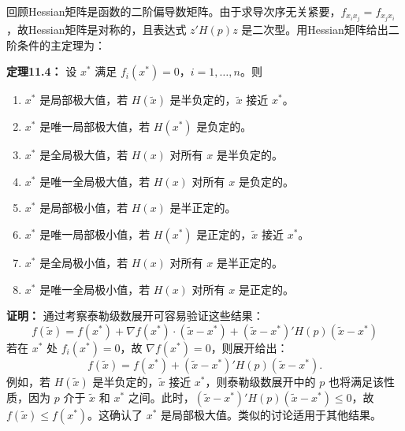 \begin{translation}
回顾Hessian矩阵是函数的二阶偏导数矩阵。由于求导次序无关紧要，$f_{x_i x_j} = f_{x_j x_i}$，故Hessian矩阵是对称的，且表达式 $z'H(p)z$ 是二次型。用Hessian矩阵给出二阶条件的主定理为：

\textbf{定理11.4：} 设 $x^*$ 满足 $f_i(x^*) = 0$，$i = 1,\ldots,n$。则
\begin{enumerate}
\item $x^*$ 是局部极大值，若 $H(\tilde{x})$ 是半负定的，$\tilde{x}$ 接近 $x^*$。
\item $x^*$ 是唯一局部极大值，若 $H(x^*)$ 是负定的。
\item $x^*$ 是全局极大值，若 $H(x)$ 对所有 $x$ 是半负定的。
\item $x^*$ 是唯一全局极大值，若 $H(x)$ 对所有 $x$ 是负定的。
\item $x^*$ 是局部极小值，若 $H(x)$ 是半正定的。
\item $x^*$ 是唯一局部极小值，若 $H(x^*)$ 是正定的，$\tilde{x}$ 接近 $x^*$。
\item $x^*$ 是全局极小值，若 $H(x)$ 对所有 $x$ 是半正定的。
\item $x^*$ 是唯一全局极小值，若 $H(x)$ 对所有 $x$ 是正定的。
\end{enumerate}

\textbf{证明：} 通过考察泰勒级数展开可容易验证这些结果：
\[
f(\tilde{x}) = f(x^*) + \nabla f(x^*) \cdot (\tilde{x} - x^*) + (\tilde{x} - x^*)'H(p)(\tilde{x} - x^*)
\]
若在 $x^*$ 处 $f_i(x^*) = 0$，故 $\nabla f(x^*) = 0$，则展开给出：
\[
f(\tilde{x}) = f(x^*) + (\tilde{x} - x^*)'H(p)(\tilde{x} - x^*).
\]
例如，若 $H(\tilde{x})$ 是半负定的，$\tilde{x}$ 接近 $x^*$，则泰勒级数展开中的 $p$ 也将满足该性质，因为 $p$ 介于 $\tilde{x}$ 和 $x^*$ 之间。此时，$(\tilde{x} - x^*)'H(p)(\tilde{x} - x^*) \leq 0$，故 $f(\tilde{x}) \leq f(x^*)$。这确认了 $x^*$ 是局部极大值。类似的讨论适用于其他结果。
\end{translation}

